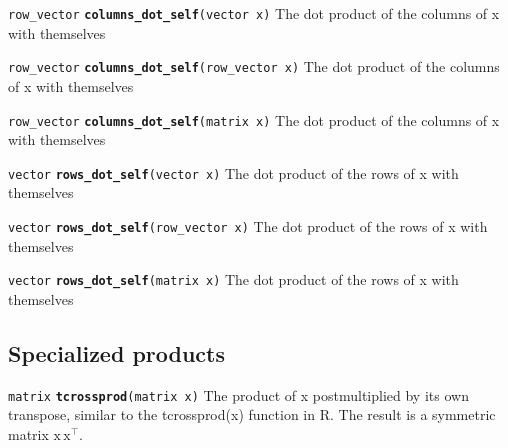 \documentclass[
  10pt,
]{book}
\begin{document}

\texttt{row\_vector} \textbf{\texttt{columns\_dot\_self}}\texttt{(vector\ x)}\newline
The dot product of the columns of x with themselves


\texttt{row\_vector} \textbf{\texttt{columns\_dot\_self}}\texttt{(row\_vector\ x)}\newline
The dot product of the columns of x with themselves


\texttt{row\_vector} \textbf{\texttt{columns\_dot\_self}}\texttt{(matrix\ x)}\newline
The dot product of the columns of x with themselves


\texttt{vector} \textbf{\texttt{rows\_dot\_self}}\texttt{(vector\ x)}\newline
The dot product of the rows of x with themselves


\texttt{vector} \textbf{\texttt{rows\_dot\_self}}\texttt{(row\_vector\ x)}\newline
The dot product of the rows of x with themselves


\texttt{vector} \textbf{\texttt{rows\_dot\_self}}\texttt{(matrix\ x)}\newline
The dot product of the rows of x with themselves

\hypertarget{specialized-products}{%
\subsection{Specialized products}\label{specialized-products}}


\texttt{matrix} \textbf{\texttt{tcrossprod}}\texttt{(matrix\ x)}\newline
The product of x postmultiplied by its own transpose, similar to the
tcrossprod(x) function in R. The result is a symmetric matrix
\(\text{x}\,\text{x}^{\top}\).
\end{document}
